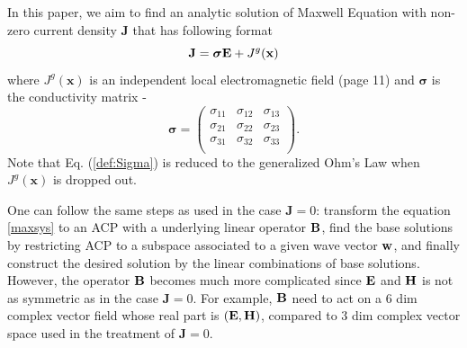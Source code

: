 \documentclass[10pt,reqno]{amsart}
\newcommand{\bB}{{\bf B}}
\newcommand{\bS}{\boldsymbol{\sigma}}
\renewcommand{\(}{\left(}
\renewcommand{\)}{\right)}
\newcommand{\bw}{{\bf w}}
\newcommand{\HH}{{\bf H}}
\newcommand{\EE}{{\bf E}}
\newcommand{\bx}{\mathbf{x}}
\newcommand{\bJ}{\mathbf{J}}
\numberwithin{equation}{section}
\begin{document}
In this paper,  we aim to find an analytic solution of Maxwell Equation with non-zero current density $\bJ$ that has following format 
\begin{equation} \label{def:Sigma}
	\bJ  = \bS \EE + J^g(\bx)
\end{equation}
where $ J^g(\bx)$ is an independent local electromagnetic field \cite{bossavit} (page 11) and $\bS$ is the conductivity matrix \cite{buschow}-\cite{Rysti}
\begin{equation}\label{def:bs}
\bS= \left(
\begin{array}{ccc}
	\sigma_{11} & \sigma_{12} & \sigma_{13}\\
	\sigma_{21} & \sigma_{22} & \sigma_{23} \\
	\sigma_{31} & \sigma_{32} & \sigma_{33} \\
\end{array}
\right).
\end{equation}
Note that Eq. (\ref{def:Sigma}) is reduced to the generalized Ohm's Law when $J^g(\bx)$ is dropped out.  

One can follow the same steps as used in the case $\bJ=0$:  transform the equation \ref{maxsys} to an ACP with a underlying linear operator $\bB$, find the base solutions by restricting ACP to a subspace associated to a given wave vector $\bw$, and finally construct the desired solution by the linear combinations of base solutions. %
However, the operator $\bB$ becomes much more complicated since $\EE$ and $\HH$ is not as symmetric as in the case $\bJ=0$.  For example, $\bB$ need to act on a $6$ dim complex vector field whose real part is $(\EE,\HH)$, compared to $3$ dim complex vector space used in the treatment of $\bJ=0$.
\end{document}
